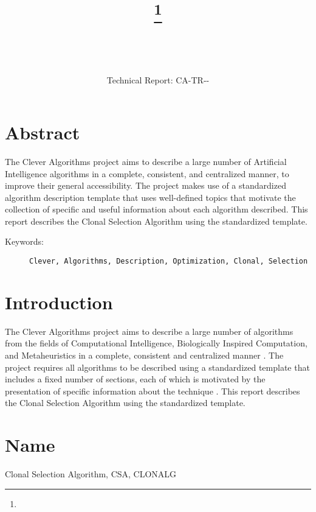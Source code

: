 \documentclass[a4paper, 11pt]{article}
\title{{\myreporttitle}\footnote{\myreportlicense}}
\author{\myreportauthor\\{\myreportemail}\\\small\myreportproject}
\date{\myreportdatefull\\{\small{Technical Report: CA-TR-{\myreportdate}-\myreportversion}}}
\begin{document}
\maketitle

\section*{Abstract} 
The Clever Algorithms project aims to describe a large number of Artificial Intelligence algorithms in a complete, consistent, and centralized manner, to improve their general accessibility. 
The project makes use of a standardized algorithm description template that uses well-defined topics that motivate the collection of specific and useful information about each algorithm described.
This report describes the Clonal Selection Algorithm using the standardized template.

\begin{description}
	\item[Keywords:] {\small\texttt{Clever, Algorithms, Description, Optimization, Clonal, Selection}}
\end{description} 

\section{Introduction} 
\label{sec:intro}
The Clever Algorithms project aims to describe a large number of algorithms from the fields of Computational Intelligence, Biologically Inspired Computation, and Metaheuristics in a complete, consistent and centralized manner \cite{Brownlee2010}.
The project requires all algorithms to be described using a standardized template that includes a fixed number of sections, each of which is motivated by the presentation of specific information about the technique \cite{Brownlee2010a}.
This report describes the Clonal Selection Algorithm using the standardized template.

\section{Name} 
\label{sec:name}
Clonal Selection Algorithm, CSA, CLONALG
\end{document}

